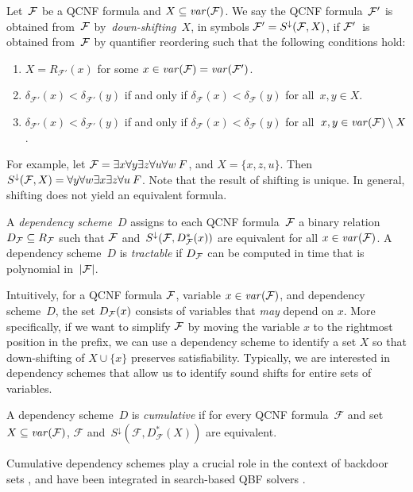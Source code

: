 \documentclass{llncs}
\def\hy{\hbox{-}\nobreak\hskip0pt} \newcommand{\ellipsis}{$\dots$}
\newcommand{\Card}[1]{|#1|}
\begin{document}
\begin{definition}[Shifting]
  Let~$\mathcal{F}$ be a QCNF formula and $X \subseteq \mathit{var}(\mathcal{F})$. We say the QCNF
  formula~$\mathcal{F}'$ is obtained from~$\mathcal{F}$ by~\emph{down-shifting}~$X$, in
  symbols $\mathcal{F}' = S^{\downarrow}(\mathcal{F},X)$, if $\mathcal{F}'$~is obtained from~$\mathcal{F}$
  by quantifier reordering such that the following conditions hold:
  \begin{enumerate}
  \item $X = R_{\mathcal{F}'}(x)$ for some $x \in \mathit{var}(\mathcal{F}) =
    \mathit{var}(\mathcal{F}')$.
  \item $\delta_{\mathcal{F}'}(x) < \delta_{\mathcal{F}'}(y)$ if and
    only if $\delta_{\mathcal{F}}(x) < \delta_{\mathcal{F}}(y)$ for
    all~$x, y \in X$.
  \item $\delta_{\mathcal{F}'}(x) < \delta_{\mathcal{F}'}(y)$ if and only if
    $\delta_{\mathcal{F}}(x) < \delta_{\mathcal{F}}(y)$ for all~$x, y \in
    \mathit{var}(\mathcal{F}) \setminus X$.
  \end{enumerate}
\end{definition}
For example, let $\mathcal{F} = \exists x \forall y \exists z \forall u
\forall w\: F$, and $X = \{x,z,u\}$. Then $S^{\downarrow}(\mathcal{F},X) =
\forall y \forall w \exists x \exists z \forall u\: F$. Note that the
result of shifting is unique. In general, shifting does not yield an
equivalent formula.
\begin{definition}
  A \emph{dependency scheme}~$D$ assigns to each QCNF formula~$\mathcal{F}$ a binary
  relation~$D_{\mathcal{F}} \subseteq R_{\mathcal{F}}$ such that $\mathcal{F}$
  and~$S^{\downarrow}(\mathcal{F}, D^*_{\mathcal{F}}(x))$ are equivalent for all $x \in
  \mathit{var}(\mathcal{F})$.  A dependency scheme~$D$ is \emph{tractable} if $D_{\mathcal{F}}$ can
  be computed in time that is polynomial in~$\Card{\FFF}$.
\end{definition}
Intuitively, for a QCNF formula $\mathcal{F}$, variable $x \in \mathit{var}(\mathcal{F})$,
and dependency scheme~$D$, the set $D_{\mathcal{F}}(x)$ consists of variables
that \emph{may} depend on $x$. More specifically, if we want to
simplify $\mathcal{F}$ by moving the variable $x$ to the rightmost position
in the prefix, we can use a dependency scheme to identify a set $X$ so
that down-shifting of $X \cup \{x\}$ preserves
satisfiability. Typically, we are interested in dependency schemes
that allow us to identify sound shifts for entire sets of variables.
\begin{definition}[Cumulative]
  \label{defn:cumul}
  A dependency scheme~$D$ is \emph{cumulative} if for every QCNF
  formula~$\mathcal{F}$ and set~$X \subseteq \mathit{var}(\mathcal{F})$,
  $\mathcal{F}$ and~$S^\downarrow(\mathcal{F}, D^*_{\mathcal{F}}(X))$
  are equivalent.
\end{definition}
Cumulative dependency schemes play a crucial role in the context of
backdoor sets \cite{SamerSzeider09a}, and have been integrated in
search\hy based QBF solvers \cite{LonsingBiere2010}.
\end{document}
